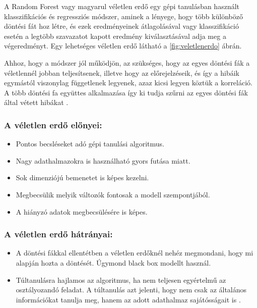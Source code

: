 A Random Forest vagy magyarul véletlen erdő egy gépi tanulásban használt klasszifikációs és regressziós módszer, aminek a lényege, hogy több különböző döntési fát hoz létre, és ezek eredményeinek átlagolásával vagy klasszifikáció esetén a legtöbb szavazatot kapott eredmény kiválasztásával adja meg a végeredményt. Egy lehetséges véletlen erdő látható a \ref{fig:veletlenerdo} ábrán.

Ahhoz, hogy a módszer jól működjön, az szükséges, hogy az egyes döntési fák a véletlennél jobban teljesítsenek, illetve hogy az előrejelzéseik, és így a hibáik egymástól viszonylag függetlenek legyenek, azaz kicsi legyen köztük a korreláció. A több döntési fa együttes alkalmazása így ki tudja szűrni az egyes döntési fák által vétett hibákat \cite{veletlen_erdo_1}.

\subsubsection{A véletlen erdő előnyei:}
\begin{itemize}
    \item Pontos becsléseket adó gépi tanulási algoritmus.
    \item Nagy adathalmazokra is használható gyors futása miatt.
    \item Sok dimenziójú bemenetet is képes kezelni.
    \item Megbecsülik melyik változók fontosak a modell szempontjából.
    \item A hiányzó adatok megbecsülésére is képes.
\end{itemize}

\subsubsection{A véletlen erdő hátrányai:}
\begin{itemize}
    \item A döntési fákkal ellentétben a véletlen erdőknél nehéz megmondani, hogy mi alapján hozta a döntését. Úgymond black box modellt használ.
    \item Túltanulásra hajlamos az algoritmus, ha nem teljesen egyértelmű az osztályozandó feladat. A túltanulás azt jelenti, hogy nem csak az általános információkat tanulja meg, hanem az adott adathalmaz sajátósságait is \cite{veletlen_erdo_3}.
\end{itemize}

